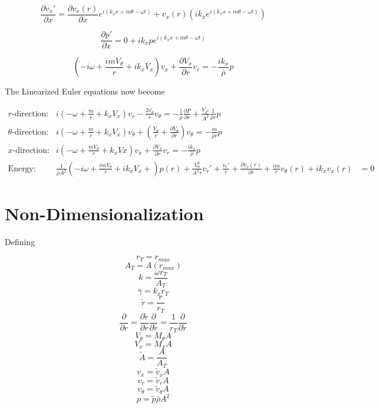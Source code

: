 \[\frac{\partial v_x'}{\partial x} = \frac{\partial v_x(r)}{\partial x} e^{i\left(k_x x + m \theta - \omega t \right)} + 
v_x(r) \left(i k_x e^{i\left(k_x x + m \theta - \omega t \right)}\right)\]

\[\frac{\partial p'}{\partial x} = 0 + ik_xpe^{i\left(k_x x + m \theta - \omega t \right)} \]

\[\left(-i\omega + \frac{imV_{\theta}}{r} + i k_xV_x\right)v_x + \frac{\partial V_x}{\partial r} v_r = - \frac{i
	k_x}{\bar{\rho}}p\]

The Linearized Euler equations now become

\begin{align*}
r\text{-direction: }& i\left(-\omega + \frac{ m}{r} +  k_x V_x \right) v_r - \frac{2 \bar{v_{\theta}}}{r}v_{\theta}  = -\frac{1}{\bar{\rho}} \frac{\partial P}{\partial r}+ \frac{V_{\theta^2}}{A^2}\frac{1}{\bar{\rho} r}p\\
\theta\text{-direction: }& i\left(-\omega + \frac{ m}{r} +  k_x V_x \right) v_{\theta} + \left(\frac{V_{\theta}}{r} +  \frac{\partial V_{\theta}}{\partial r}\right)v_\theta = -\frac{m}{\bar{\rho}r}p \\ 
x\text{-direction: }&i\left(-\omega + \frac{mV_{\theta}}{r} +  k_xVx\right)v_x + \frac{\partial V_x}{\partial r} v_r = - \frac{i
	k_x}{\bar{\rho}}p\\ 
\text{Energy: }&\frac{1}{\bar{\rho} A^2} \left(-i\omega + \frac{imV_{\theta}}{r} + ik_xV_x  +
\right)p(r)  +
\frac{V_{\theta}^2}{A^2 r}v_r'+ \frac{v_r'}{r} +
\frac{\partial v_r(r)}{\partial r}+ 
\frac{im}{r} v_{\theta}(r)
+
ik_xv_x(r) 
&= 0
\end{align*}


\section{Non-Dimensionalization}
Defining 

\[r_T = r_{max}\]
\[A_T = A(r_{max})\]
\[k = \frac{\omega r_T}{A_T}\]
\[\bar{\gamma} = k_x r_T\]
\[\tilde{r} = \frac{r}{r_T}\]
\[\frac{\partial }{\partial r} = \frac{\partial \tilde{r}}{\partial r} \frac{\partial }{\partial \tilde{r}} = \frac{1}{r_T} \frac{\partial }{\partial \tilde{r}}\]
\[V_{\theta} = M_{\theta} A\]
\[V_{x} = M_{x} A\]
\[\tilde{A} = \frac{A}{A_T}\]
\[v_{x} =\tilde{v}_x A\]
\[v_{r} =\tilde{v}_r A\]
\[v_{\theta} =\tilde{v}_{\theta} A\]
\[p = \tilde{p} \bar{\rho} A^2\]

